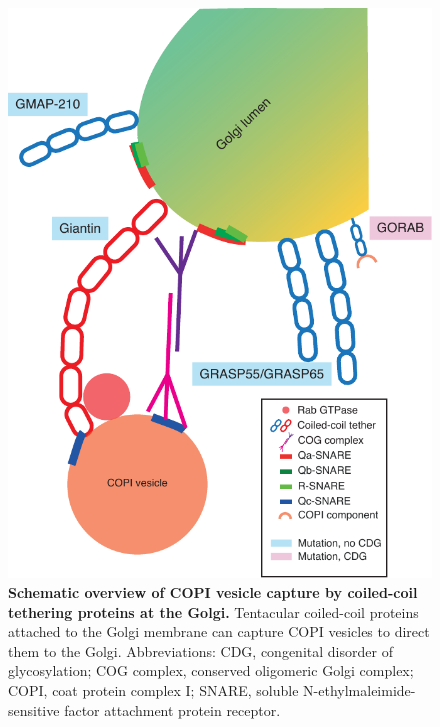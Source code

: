\begin{figure}
    \includegraphics[keepaspectratio=true,width=\textwidth,height=\textheight]{chapters/chapter2/chapter2_Figure3}
    \caption{\textbf{Schematic overview of COPI vesicle capture by coiled-coil tethering proteins at the Golgi.} Tentacular coiled-coil proteins attached to the Golgi membrane can capture COPI vesicles to direct them to the Golgi. Abbreviations: CDG, congenital disorder of glycosylation; COG complex, conserved oligomeric Golgi complex; COPI, coat protein complex I; SNARE, soluble N-ethylmaleimide-sensitive factor attachment protein receptor.}
    \label{fig:ch2fig3}
\end{figure}

